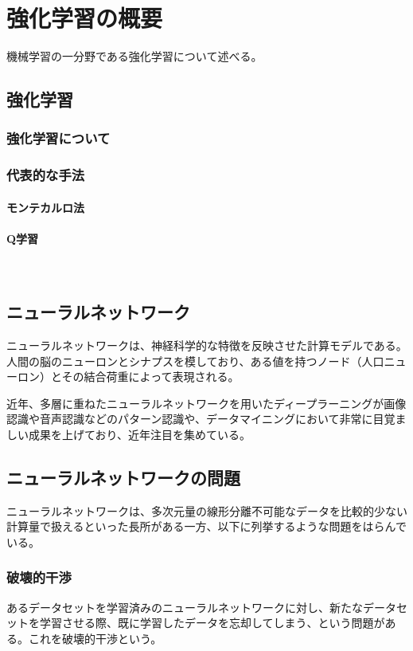 \chapter{強化学習の概要}
機械学習の一分野である強化学習について述べる。

\section{強化学習}

\subsection{強化学習について}

\subsection{代表的な手法}
\subsubsection{モンテカルロ法}
\subsubsection{Q学習}

\

\section{ニューラルネットワーク}
ニューラルネットワークは、神経科学的な特徴を反映させた計算モデルである。人間の脳のニューロンとシナプスを模しており、ある値を持つノード（人口ニューロン）とその結合荷重によって表現される。

近年、多層に重ねたニューラルネットワークを用いたディープラーニングが画像認識や音声認識などのパターン認識や、データマイニングにおいて非常に目覚ましい成果を上げており、近年注目を集めている。

\section{ニューラルネットワークの問題}
ニューラルネットワークは、多次元量の線形分離不可能なデータを比較的少ない計算量で扱えるといった長所がある一方、以下に列挙するような問題をはらんでいる。

\subsection{破壊的干渉}
あるデータセットを学習済みのニューラルネットワークに対し、新たなデータセットを学習させる際、既に学習したデータを忘却してしまう、という問題がある。これを破壊的干渉という。

